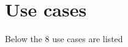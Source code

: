 \documentclass[pdftex,12pt,a4paper]{article}
\begin{document}
\section{Use cases}
Below the 8 use cases are listed


\pagebreak

\pagebreak

\pagebreak

\end{document}
